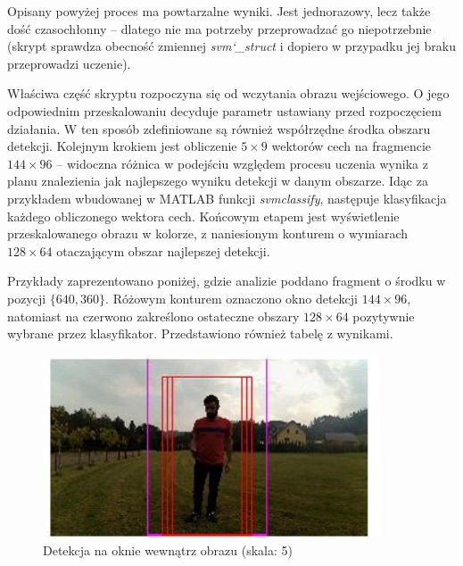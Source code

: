 Opisany powyżej proces ma powtarzalne wyniki. 
Jest jednorazowy, lecz także dość czasochłonny -- dlatego nie ma potrzeby przeprowadzać go niepotrzebnie (skrypt sprawdza obecność zmiennej \textit{svm\char`_struct} i dopiero w przypadku jej braku przeprowadzi uczenie). %

Właściwa część skryptu rozpoczyna się od wczytania obrazu wejściowego. 
O jego odpowiednim przeskalowaniu decyduje parametr ustawiany przed rozpoczęciem działania. 
W ten sposób zdefiniowane są również współrzędne środka obszaru detekcji. 
Kolejnym krokiem jest obliczenie $5\times 9$ wektorów cech na fragmencie $144 \times 96$ -- widoczna różnica w podejściu względem procesu uczenia wynika z planu znalezienia jak najlepszego wyniku detekcji w danym obszarze. %
Idąc za przykładem wbudowanej w MATLAB funkcji \textit{svmclassify}, następuje klasyfikacja każdego obliczonego wektora cech. 
Końcowym etapem jest wyświetlenie przeskalowanego obrazu w kolorze, z naniesionym konturem o wymiarach $128\times 64$ otaczającym obszar najlepszej detekcji. 

Przykłady zaprezentowano poniżej, gdzie analizie poddano fragment o środku w pozycji $\{640,360\}$.
Różowym konturem oznaczono okno detekcji $144 \times 96$, natomiast na czerwono zakreślono ostateczne obszary $128\times 64$ pozytywnie wybrane przez klasyfikator. Przedstawiono również tabelę z wynikami. %
\begin{figure}[]
	\centering
	\includegraphics[width=10cm]{3_SVM_model.jpg}
	\caption{Detekcja na oknie wewnątrz obrazu (skala: 5)}
	\label{fig:SVMmodel}
\end{figure}

